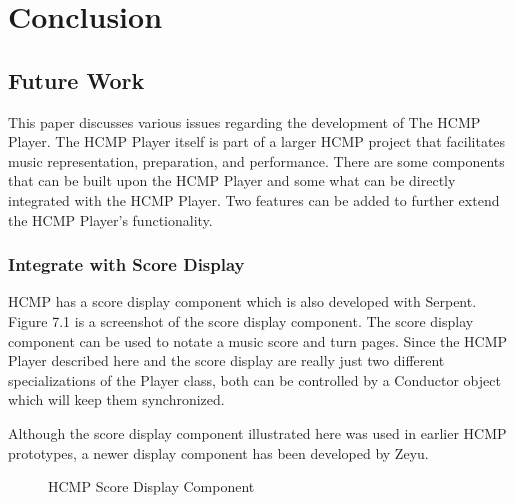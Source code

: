 \chapter{Conclusion} %

\section{Future Work}

This paper discusses various issues regarding the development of 
The HCMP Player. The HCMP Player itself is part of a larger HCMP project 
that facilitates music representation, preparation, and performance.
There are some components that can be built upon the HCMP Player and some 
what can be directly integrated with the HCMP Player. Two
features can be added to further extend the HCMP Player's functionality. 

\subsection{Integrate with Score Display}
HCMP has a score display component which is also developed with Serpent.
Figure 7.1 is a screenshot of the score display component. The score 
display component can be used to notate a music score and turn
pages. Since the HCMP Player described here and the score display 
are really just two different specializations of the Player class,
both can be controlled by a Conductor object which will keep them synchronized.

Although the score display component illustrated here was used in earlier 
HCMP prototypes, a newer display component has been developed by Zeyu.


\begin{figure}[H]
\caption{HCMP Score Display Component \cite{Dawen:ISMIR2011}}
\end{figure}

